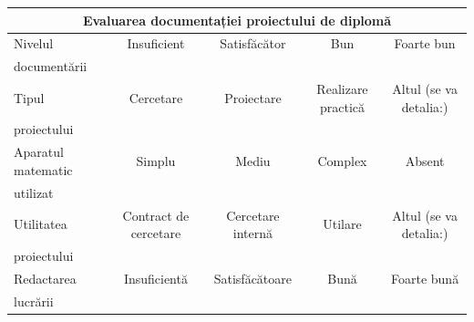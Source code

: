 \begin{flushleft}
\hspace*{-1.5cm}
\begin{tabular}{l l c c c c }
	\hline
	\toprule
	\multicolumn{6}{c}{\textbf{Evaluarea documentației proiectului de diplomă}} \\

	\hline
	\toprule
	
	\multicolumn{2}{l}{Nivelul} & Insuficient & Satisfăcător & Bun & Foarte bun  \\
	\multicolumn{2}{l}{documentării}  &	\unCheckedBox\hspace{5pt}  &
	\unCheckedBox\hspace{5pt}  & \unCheckedBox\hspace{5pt}  &
	\unCheckedBox\hspace{5pt}   \\

	\hline
	\midrule
	\multicolumn{2}{l}{Tipul} & Cercetare &
	Proiectare &
	Realizare practică & Altul (se va detalia:) \\
	\multicolumn{2}{l}{proiectului} & \unCheckedBox\hspace{5pt} &
	\unCheckedBox\hspace{5pt} &
	\unCheckedBox\hspace{5pt} &	\unCheckedBox\hspace{5pt}  \\

	\hline
	\midrule
	\multicolumn{2}{l}{Aparatul matematic} & 
	Simplu & Mediu & Complex & Absent \\
	\multicolumn{2}{l}{utilizat}	&
	\unCheckedBox\hspace{5pt} & \unCheckedBox\hspace{5pt}  &
	\unCheckedBox\hspace{5pt}  &
	\unCheckedBox\hspace{5pt}  \\
		
	\hline
	\midrule
	\multicolumn{2}{l}{Utilitatea} &
	Contract de cercetare &	Cercetare internă & Utilare & Altul (se va detalia:) \\
	\multicolumn{2}{l}{proiectului} &
	\unCheckedBox\hspace{5pt} &	
	\unCheckedBox\hspace{5pt} &	
	\unCheckedBox\hspace{5pt} &
	\unCheckedBox\hspace{5pt} \\


	\hline
	\midrule	
	\multicolumn{2}{l}{Redactarea} &
	Insuficientă & Satisfăcătoare  & Bună &
	Foarte bună \\
	\multicolumn{2}{l}{lucrării}	&
	\unCheckedBox\hspace{5pt} &
	\unCheckedBox\hspace{5pt} &
	\unCheckedBox\hspace{5pt} &
	\unCheckedBox\hspace{5pt} \\


\end{tabular}
\end{flushleft}
